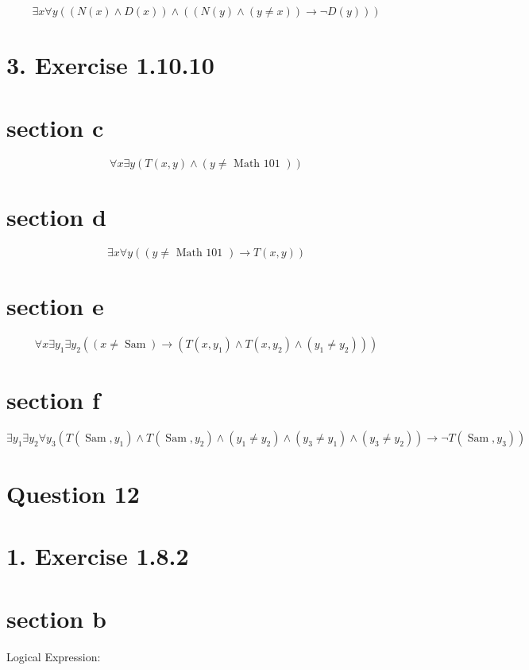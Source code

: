 \documentclass[10pt]{article}
\begin{document}
$$
\exists x \forall y((N(x) \wedge D(x)) \wedge((N(y) \wedge(y \neq x)) \rightarrow \neg D(y)))
$$

\section*{3. Exercise 1.10.10}
\section*{section c}

$$
\forall x \exists y(T(x, y) \wedge(y \neq \text { Math 101 }))
$$

\section*{section d}

$$
\exists x \forall y((y \neq \text { Math 101 }) \rightarrow T(x, y))
$$

\section*{section e}

$$
\forall x \exists y_{1} \exists y_{2}\left((x \neq \operatorname{Sam}) \rightarrow\left(T\left(x, y_{1}\right) \wedge T\left(x, y_{2}\right) \wedge\left(y_{1} \neq y_{2}\right)\right)\right)
$$

\section*{section f}
$\left.\exists y_{1} \exists y_{2} \forall y_{3}\left(T\left(\operatorname{Sam}, y_{1}\right) \wedge T\left(\operatorname{Sam}, y_{2}\right) \wedge\left(y_{1} \neq y_{2}\right) \wedge\left(y_{3} \neq y_{1}\right) \wedge\left(y_{3} \neq y_{2}\right)\right) \rightarrow \neg T\left(\operatorname{Sam}, y_{3}\right)\right)$

\pagebreak
\section*{Question 12}
\section*{1. Exercise 1.8.2}
\section*{section b}
Logical Expression:
\end{document}
